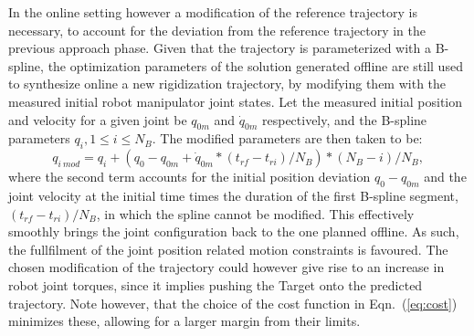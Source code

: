 In the online setting however a modification of the reference trajectory is necessary, to account for the deviation from the reference trajectory in the previous approach phase. Given that the trajectory is parameterized with a B-spline, the optimization parameters of the solution generated offline are still used to synthesize online a new rigidization trajectory, by modifying them with the measured initial robot manipulator joint states. Let the measured initial position and velocity for a given joint be $q_{0m}$ and $\dot{q}_{0m}$ respectively, and the B-spline parameters $q_i, 1 \leq i \leq N_B$. The modified parameters are then taken to be:
\begin{equation}
q_{i \: mod} =   q_i +  (q_0 - q_{0m} + \dot{q}_{0m} * ({t_{rf}}-{t_{ri}})/N_B) * (N_B-i)/N_B,
\end{equation}
where the second term accounts for the initial position deviation $q_0 - q_{0m}$ and the joint velocity at the initial time times the duration of the first B-spline segment, $({t_{rf}}-{t_{ri}})/N_B$, in which the spline cannot be modified. This effectively smoothly brings the joint configuration back to the one planned offline. As such, the fullfilment of the joint position related motion constraints is favoured. The chosen modification of the trajectory could however give rise to an increase in robot joint torques, since it implies pushing the Target onto the predicted trajectory. Note however, that the choice of the cost function in Eqn.~(\ref{eq:cost}) minimizes these, allowing for a larger margin from their limits.
%
